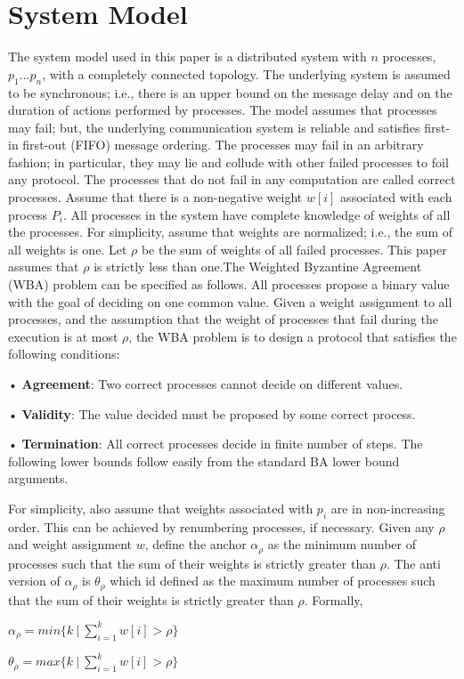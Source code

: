 \documentclass[conference]{IEEEtran}
\begin{document}
\section{System Model}
The system model used in this paper is a distributed system
with $n$ processes, $p_1...p_n$, with a completely connected topology. The underlying system is assumed to be synchronous; i.e.,
there is an upper bound on the message delay and on the duration of actions performed by processes. The model assumes
that processes may fail; but, the underlying communication
system is reliable and satisfies first-in first-out (FIFO) message
ordering. The processes may fail in an arbitrary fashion; in
particular, they may lie and collude with other failed processes
to foil any protocol. The processes that do not fail in any
computation are called correct processes. Assume that there
is a non-negative weight $w[i]$ associated with each process
$P_i$. All processes in the system have complete knowledge
of weights of all the processes. For simplicity, assume that
weights are normalized; i.e., the sum of all weights is one.
Let $ρ$ be the sum of weights of all failed processes. This paper
assumes that $ρ$ is strictly less than one.The Weighted Byzantine Agreement (WBA) problem can be specified as follows. All processes propose a binary value with the goal of deciding on one common value. Given a
weight assignment to all processes, and the assumption that
the weight of processes that fail during the execution is at most
$ρ$, the WBA problem is to design a protocol that satisfies the
following conditions:

• \textbf{Agreement}: Two correct processes cannot decide on
different values.

• \textbf{Validity}: The value decided must be proposed by some
correct process.

• \textbf{Termination}: All correct processes decide in finite number of steps.
The following lower bounds follow easily from the standard
BA lower bound arguments.

For simplicity, also assume that weights associated with
$p_i$ are in non-increasing order. This can be achieved by
renumbering processes, if necessary. Given any $\rho$ and weight
assignment $w$, define the anchor $\alpha_\rho$ as the minimum number
of processes such that the sum of their weights is strictly
greater than $\rho$. The anti version of $\alpha_\rho$ is $\theta_\rho$ which id defined as the maximum number of processes such that the sum of their weights is strictly greater than $\rho$. Formally,
\begin{center}
$\alpha_\rho = min\{k~|~\sum_{i = 1}^k {w[i]} > \rho\}$
\end{center}
\begin{center}
$\theta_\rho = max\{k~ |~ \sum_{i = 1}^k{w[i]} > \rho\}$
\end{center}
\end{document}
